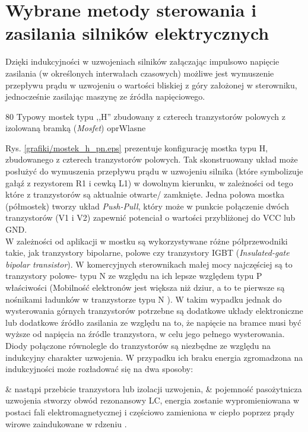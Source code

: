\section{Wybrane metody sterowania i zasilania silników elektrycznych}

Dzięki indukcyjności w uzwojeniach silników załączając impulsowo napięcie zasilania (w określonych interwałach czasowych) możliwe jest wymuszenie przepływu prądu w uzwojeniu o wartości bliskiej z góry założonej w sterowniku, jednocześnie zasilając maszynę ze źródła napięciowego.

	{80}
	{Typowy mostek typu ,,H'' zbudowany z czterech tranzystorów polowych z izolowaną bramką ({\it Mosfet})}
	{oprWlasne}

Rys. \ref{grafiki/mostek_h_pn.eps} prezentuje konfigurację mostka typu H, zbudowanego z czterech tranzystorów polowych. Tak skonstruowany układ może posłużyć do wymuszenia przepływu prądu w uzwojeniu silnika (które symbolizuje gałąź z rezystorem R1 i cewką L1) w dowolnym kierunku, w zależności od tego które z tranzystorów są aktualnie otwarte/ zamknięte. Jedna połowa mostka (półmostek) tworzy układ {\it Push-Pull}, który może w punkcie połączenie dwóch tranzystorów (V1 i V2) zapewnić potenciał o wartości przybliżonej do VCC lub GND. \\

W zależności od aplikacji w mostku są wykorzystywane różne półprzewodniki takie, jak tranzystory bipolarne, polowe czy tranzystory IGBT ({\it Insulated-gate bipolar transistor}). W komercyjnych sterownikach małej mocy najczęściej są to tranzystory polowe- typu N ze względu na ich lepsze względem typu P właściwości (Mobilność elektronów jest większa niż dziur, a to te pierwsze są nośnikami ładunków w tranzystorze typu N \cite{tietze}). W takim wypadku jednak do wysterowania górnych tranzystorów potrzebne są dodatkowe układy elektroniczne lub dodatkowe źródło zasilania ze względu na to, że napięcie na bramce musi być wyższe od napięcia na źródle tranzystora, w celu jego pełnego wysterowania. \\

Diody połączone równolegle do tranzystorów są niezbędne ze względu na indukcyjny charakter uzwojenia. W przypadku ich braku energia zgromadzona na indukcyjności może rozładować się na dwa sposoby: 

\begin{easylist}
	& nastąpi przebicie tranzystora lub izolacji uzwojenia,
	& pojemność pasożytnicza uzwojenia stworzy obwód rezonansowy LC, energia zostanie wypromieniowana w postaci fali elektromagnetycznej i częściowo zamieniona w ciepło poprzez prądy wirowe zaindukowane w rdzeniu \cite{przepiorkowski}.
	\\
\end{easylist}





\clearpage




